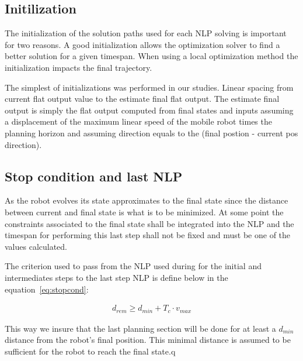 \documentclass[eprint]{actapoly}
\begin{document}
\subsection{Initilization}


The initialization of the solution paths used for each NLP solving is important for two reasons. A good initialization allows the
optimization solver to find a better solution for a given timespan. When using a local optimization method the initialization
impacts the final trajectory.

The simplest of initializations was performed in our studies. Linear spacing from current flat output value to the estimate final flat output.
The estimate final output is simply the flat output computed from final states and inputs assuming a displacement of the maximum linear speed
of the mobile robot times the planning horizon and assuming direction equals to the (final postion - current pos direction).


\subsection{Stop condition and last NLP}


As the robot evolves its state approximates to the final state since the distance between current and final state is what is to be minimized.
At some point the constraints associated to the final state shall be integrated into the NLP and the timespan for performing this last
step shall not be fixed and must be one of the values calculated.

The criterion used to pass from the NLP used during for the initial and intermediates steps to the last step NLP 
is define below in the equation~\ref{eq:stopcond}:

\begin{align}
  d_{rem} \geq d_{min} + T_c \cdot v_{max}
\end{align}

This way we insure that the last planning section will be done for at least a $d_{min}$ distance from the robot's final position.
This minimal distance is assumed to be sufficient for the robot to reach the final state.q
\end{document}
